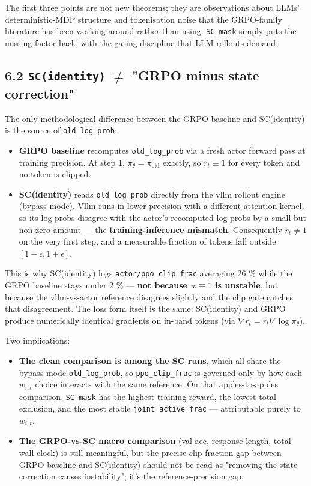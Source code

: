 \documentclass[11pt,a4paper]{article}
\theoremstyle{remark}
\begin{document}
The first three points are not new theorems; they are observations about LLMs' deterministic-MDP structure and tokenisation noise that the GRPO-family literature has been working around rather than using. \texttt{SC-mask} simply puts the missing factor back, with the gating discipline that LLM rollouts demand.

\subsection*{6.2 \texttt{SC(identity)} $\neq$ "GRPO minus state correction"}

The only methodological difference between the GRPO baseline and SC(identity) is the source of \texttt{old\_log\_prob}:

\begin{itemize}[leftmargin=1.2em]
\item \textbf{GRPO baseline} recomputes \texttt{old\_log\_prob} via a fresh actor forward pass at training precision. At step 1, $\pi_\theta=\pi_{\text{old}}$ exactly, so $r_t\equiv 1$ for every token and no token is clipped.
\item \textbf{SC(identity)} reads \texttt{old\_log\_prob} directly from the vllm rollout engine (bypass mode). Vllm runs in lower precision with a different attention kernel, so its log-probs disagree with the actor's recomputed log-probs by a small but non-zero amount --- the \textbf{training-inference mismatch}. Consequently $r_t\ne 1$ on the very first step, and a measurable fraction of tokens fall outside $[1-\epsilon,1+\epsilon]$.
\end{itemize}

This is why SC(identity) logs \texttt{actor/ppo\_clip\_frac} averaging 26 \% while the GRPO baseline stays under 2 \% --- \textbf{not because $w\equiv 1$ is unstable}, but because the vllm-vs-actor reference disagrees slightly and the clip gate catches that disagreement. The loss form itself is the same: SC(identity) and GRPO produce numerically identical gradients on in-band tokens (via $\nabla r_t = r_t\nabla\log\pi_\theta$).

Two implications:

\begin{itemize}[leftmargin=1.2em]
\item \textbf{The clean comparison is among the SC runs}, which all share the bypass-mode \texttt{old\_log\_prob}, so \texttt{ppo\_clip\_frac} is governed only by how each $w_{i,t}$ choice interacts with the same reference. On that apples-to-apples comparison, \texttt{SC-mask} has the highest training reward, the lowest total exclusion, and the most stable \texttt{joint\_active\_frac} --- attributable purely to $w_{i,t}$.
\item \textbf{The GRPO-vs-SC macro comparison} (val-acc, response length, total wall-clock) is still meaningful, but the precise clip-fraction gap between GRPO baseline and SC(identity) should not be read as "removing the state correction causes instability"; it's the reference-precision gap.
\end{itemize}
\end{document}
